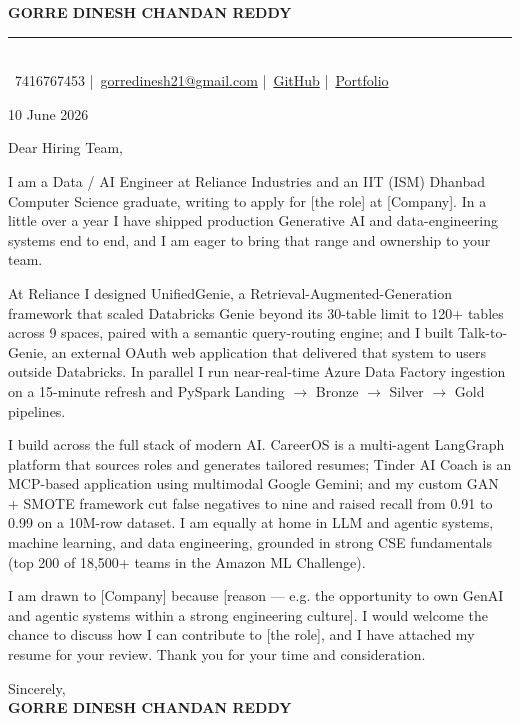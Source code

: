\documentclass[a4paper,11pt]{article}
\begin{document}
\begin{center}
{\LARGE\textbf{GORRE DINESH CHANDAN REDDY}}\\[4pt]
\rule{\linewidth}{1.2pt}\\[3pt]
\small \faPhone\ 7416767453 \quad|\quad \faEnvelope\ \href{mailto:gorredinesh21@gmail.com}{gorredinesh21@gmail.com} \quad|\quad \faGithub\ \href{https://github.com/gorredinesh21}{GitHub} \quad|\quad \faGlobe\ \href{https://portfolio-eight-coral-tabh47k4e7.vercel.app/}{Portfolio}
\end{center}
\vspace{6pt}

10 June 2026

\vspace{8pt}
Dear Hiring Team,

I am a Data / AI Engineer at Reliance Industries and an IIT (ISM) Dhanbad Computer Science graduate, writing to apply for [the role] at [Company]. In a little over a year I have shipped production Generative AI and data-engineering systems end to end, and I am eager to bring that range and ownership to your team.

At Reliance I designed UnifiedGenie, a Retrieval-Augmented-Generation framework that scaled Databricks Genie beyond its 30-table limit to 120+ tables across 9 spaces, paired with a semantic query-routing engine; and I built Talk-to-Genie, an external OAuth web application that delivered that system to users outside Databricks. In parallel I run near-real-time Azure Data Factory ingestion on a 15-minute refresh and PySpark Landing $\rightarrow$ Bronze $\rightarrow$ Silver $\rightarrow$ Gold pipelines.

I build across the full stack of modern AI. CareerOS is a multi-agent LangGraph platform that sources roles and generates tailored resumes; Tinder AI Coach is an MCP-based application using multimodal Google Gemini; and my custom GAN + SMOTE framework cut false negatives to nine and raised recall from 0.91 to 0.99 on a 10M-row dataset. I am equally at home in LLM and agentic systems, machine learning, and data engineering, grounded in strong CSE fundamentals (top 200 of 18,500+ teams in the Amazon ML Challenge).

I am drawn to [Company] because [reason --- e.g. the opportunity to own GenAI and agentic systems within a strong engineering culture]. I would welcome the chance to discuss how I can contribute to [the role], and I have attached my resume for your review. Thank you for your time and consideration.

\vspace{10pt}
Sincerely,\\[2pt]
\textbf{GORRE DINESH CHANDAN REDDY}
\end{document}

